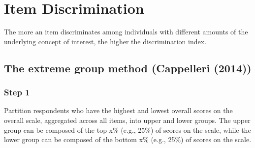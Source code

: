 \documentclass[
  letterpaper,
  DIV=11,
  numbers=noendperiod]{scrreprt}
\begin{document}
\hypertarget{item-discrimination}{%
\chapter{Item Discrimination}\label{item-discrimination}}

The more an item discriminates among individuals with different amounts
of the underlying concept of interest, the higher the discrimination
index.

\hypertarget{the-extreme-group-method-cappelleri}{%
\section{The extreme group method (Cappelleri
(2014))}\label{the-extreme-group-method-cappelleri}}

\hypertarget{step-1}{%
\subsection{Step 1}\label{step-1}}

Partition respondents who have the highest and lowest overall scores on
the overall scale, aggregated across all items, into upper and lower
groups. The upper group can be composed of the top x\% (e.g., 25\%) of
scores on the scale, while the lower group can be composed of the bottom
x\% (e.g., 25\%) of scores on the scale.
\end{document}
